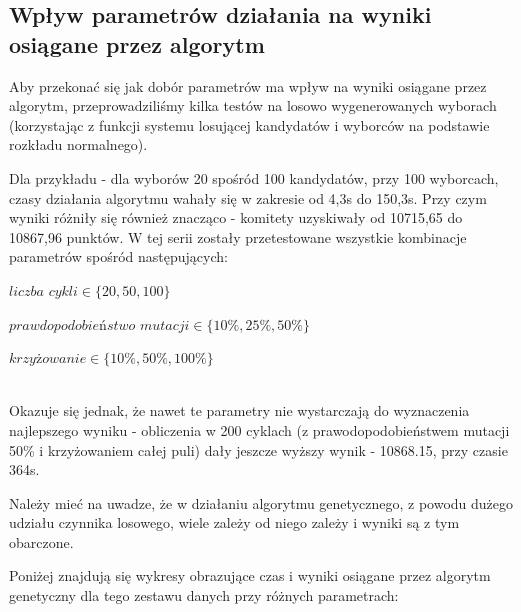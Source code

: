 \documentclass[pdflatex,11pt]{../aghdoc_version2}
\begin{document}
\subsection{Wpływ parametrów działania na wyniki osiągane przez algorytm}
Aby przekonać się jak dobór parametrów ma wpływ na wyniki osiągane przez algorytm, przeprowadziliśmy kilka testów na losowo wygenerowanych wyborach (korzystając z funkcji systemu losującej kandydatów i wyborców na podstawie rozkładu normalnego).

Dla przykładu - dla wyborów 20 spośród 100 kandydatów, przy 100 wyborcach, czasy działania algorytmu wahały się w zakresie od 4,3s do 150,3s. Przy czym wyniki różniły się również znacząco - komitety uzyskiwały od 10715,65 do 10867,96 punktów. W tej serii zostały przetestowane wszystkie kombinacje parametrów spośród następujących:

$\textit{liczba cykli} \in \{ 20, 50, 100 \}$

$\textit{prawdopodobieństwo mutacji} \in \{ 10\%, 25\%, 50\% \}$

$\textit{krzyżowanie} \in \{ 10\%, 50\%, 100\% \}$

~\\ 
Okazuje się jednak, że nawet te parametry nie wystarczają do wyznaczenia najlepszego wyniku - obliczenia w 200 cyklach (z prawodopodobieństwem mutacji 50\% i krzyżowaniem całej puli) dały jeszcze wyższy wynik - 10868.15, przy czasie 364s. 

Należy mieć na uwadze, że w działaniu algorytmu genetycznego, z powodu dużego udziału czynnika losowego, wiele zależy od niego zależy i wyniki są z tym obarczone.

\newpage

Poniżej znajdują się wykresy obrazujące czas i wyniki osiągane przez algorytm genetyczny dla tego zestawu danych przy różnych parametrach:
\end{document}
